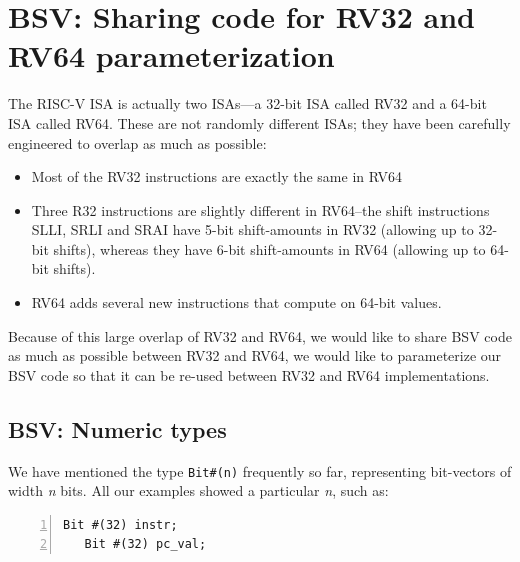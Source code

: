 \Endexercise


\section{BSV: Sharing code for RV32 and RV64 {\via} parameterization}

\label{BSV_Paramterizing_XLEN}


The RISC-V ISA is actually two ISAs---a 32-bit ISA called RV32 and a
64-bit ISA called RV64.  These are not randomly different ISAs; they
have been carefully engineered to overlap as much as possible:

\begin{itemize}

\item Most of the RV32 instructions are exactly the same in RV64

\item Three R32 instructions are slightly different in RV64--the shift
instructions SLLI, SRLI and SRAI have 5-bit shift-amounts in RV32
(allowing up to 32-bit shifts), whereas they have 6-bit shift-amounts
in RV64 (allowing up to 64-bit shifts).

\item RV64 adds several new instructions that compute on 64-bit values.

\end{itemize}

Because of this large overlap of RV32 and RV64, we would like to share
BSV code as much as possible between RV32 and RV64, {\ie} we would
like to parameterize our BSV code so that it can be re-used between
RV32 and RV64 implementations.


\subsection{BSV: Numeric types}

\label{BSV_Numeric_types}

We have mentioned the type \verb|Bit#(n)| frequently so far,
representing bit-vectors of width \emph{n} bits.  All our examples
showed a particular \emph{n}, such as:

\begin{Verbatim}[frame=single, numbers=left]
   Bit #(32) instr;
   Bit #(32) pc_val;
\end{Verbatim}

